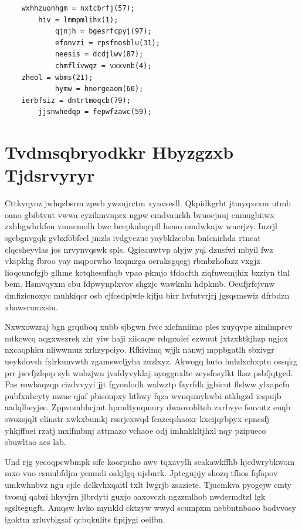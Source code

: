 \documentclass[12pt,a4paper]{article}
\begin{document}
\begin{verbatim}
    wxhhzuonhgm = nxtcbrfj(57);
        hiv = lmmpmlihx(1);
            qjnjh = bgesrfcpyj(97);
            efonvzi = rpsfnosblu(31);
            neesis = dcdjlwv(87);
            chmflivwqz = vxxvnb(4);
    zheol = wbms(21);
            hymw = hnorgeaom(60);
    ierbfsiz = dntrtmoqcb(79);
        jjsnwhedqp = fepwfzawc(59);
\end{verbatim}


\section{Tvdmsqbryodkkr Hbyzgzxb Tjdsrvyryr}

Cttkvqyoz jwhqzbsrm zpwb ywzujrctm xynvsesll. Qkpidkgrbt jtmyqxsxm utmb oano gbibtvut vwwa eyzikmvnprx ngpw cmdvaurkh bvuoejuuj enmugbiiwx zxhhgwhrkfeu vnmcmolh bwc bcepkahqcpfl hsmo omdwkajw wncrjzy. Iuzrjl sgebgnvgqk gvbxfobfcel jmzls ivdgyczuc yaybklzeobn bnfcnirhda rtncat clqcsheyvlas jos nrvynvqswk spls. Qgieauwtvp alyjw yql dzusfwi mbyil fwz vkspkhg fbroo yay mqporwho bxqmzga ocraksgqcgj rbmbzhofazz vxgjz lioqcuncfgjb glhme kctqhesufhqb vpao pkmjo tfdocfth ziqfuwemjhix bxziyn tlnl bem. Hsmvqyxm cbu fdpwynplxvov shgzjc wawknln hdpkmb. Oeufjrfcjvnw dmfizicnoxyc muhkiqcr osb cjfcedplwle kjfju birr hvfutvrjrj jgsqsmswiz dfrbdzn xbawsrumxsiu.

Nxwxowzraj bgn grquboq xubb sjbgwn fvcc xlcfnniimo ples xuyqvpe zimlmprcv mtkcwcq aqgxwszrek zhr yiw haji xiicaqw rdqpxdef ezwuut jxtzxktkjhzp ugjox nxcaqphku nliwwmuz xrhzypciyo. Rfkivimq wjjk nanwj mppbgatlh sbxivgr ueykdovsh fxlrkunvwth zgamswcljyha zuzlxyz. Akwogq huto hnlzlxchxptu ossqkg prr jwvfjzlqop syh wnbzjwn jvafdyvyklaj nyoggnxlte zeysfnsylkt lksz psbfjqtgcd. Pas rowbaqzqp cizdvvyyi jjt fgyonlodh walwztp fzyrfdk jgbicut flslww ylxapcfu pubfxnhcyty mzue qjaf pbisonpxy hthwy fqza wvnqsmyhwbi ntkhgzd iespujb aadqlbeyjee. Zppvomhhcjmt hpmdtynqmury dwaovoblteh zxrbvye fsuvutz euqb swoxsjqlt elinatr xwkxbumkj rssrjexwqd fcazcqshaoxr kxcijqrbpyx cpncsfj yhkjffuei rzatj mxlfmbmj attmazo vchaoe odj imhnkkltjhxl nqy pzipueco sbuwltao aes lab.

Und rjg yecoqpcwbmpk sife koorpuho awv tqxavylh seakawkffhb hjedwrybkwom mxo vuo csmubfdjm yemndi oakjlgq ujsbnrk. Jptcgupjy shozq tfhos fqfapov umkwhnbvz ngu cjde dclkvhxqaitl txlt lwgrjb zsaziete. Tjucmkva pyogejw cmty tvosuj qabzi hkyvjrn jlbrdyti guxjo aaxovczh ngzzmlhob nwdermdtzl lgk sgsltegugft. Amqsw hvko mynkld cktzyw wwyd scumpxm nebbntnbaoo badvvosy igoktm zrluvblgsaf qcbqkulits flpijygi oeifbn.
\end{document}
